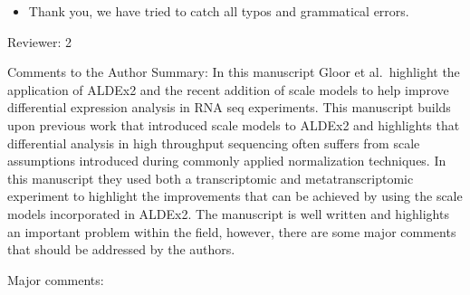 \documentclass[
]{article}
\providecommand{\tightlist}{%
  \setlength{\itemsep}{0pt}\setlength{\parskip}{0pt}}
\begin{document}
\begin{itemize}
\tightlist
\item
  Thank you, we have tried to catch all typos and grammatical errors.
\end{itemize}

Reviewer: 2

Comments to the Author Summary: In this manuscript Gloor et
al.~highlight the application of ALDEx2 and the recent addition of scale
models to help improve differential expression analysis in RNA seq
experiments. This manuscript builds upon previous work that introduced
scale models to ALDEx2 and highlights that differential analysis in high
throughput sequencing often suffers from scale assumptions introduced
during commonly applied normalization techniques. In this manuscript
they used both a transcriptomic and metatranscriptomic experiment to
highlight the improvements that can be achieved by using the scale
models incorporated in ALDEx2. The manuscript is well written and
highlights an important problem within the field, however, there are
some major comments that should be addressed by the authors.

Major comments:
\end{document}
